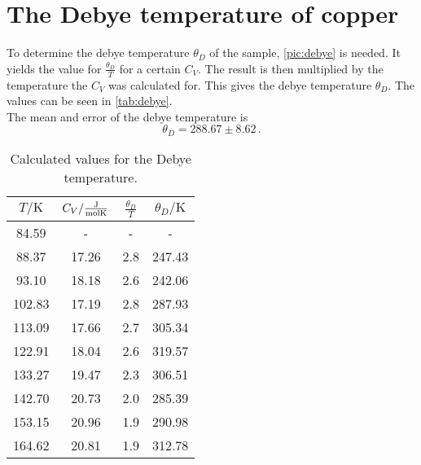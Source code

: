 \section{The Debye temperature of copper}

To determine the debye temperature $\theta_D$ of the sample, \autoref{pic:debye} is needed. It yields the value for $\frac{\theta_D}{T}$ for a certain $C_V$.
The result is then multiplied by the temperature the $C_V$ was calculated for. This gives the debye temperature $\theta_D$. The values can be seen in \autoref{tab:debye}.\\
The mean and error of the debye temperature is 
\begin{equation}
    \theta_D = 288.67 \pm 8.62 \, .
\end{equation}
\begin{table}[htbp] 
    \centering 
    \begin{tabular}{cccc} 
        \toprule $T/\unit{\kelvin}$ & $C_V / \unit{\frac{\joule}{\mol\kelvin}} $ & $\frac{\theta_D}{T}$ & $\theta_D/\unit{\kelvin} $\\ 
        \midrule 
        84.59  & -      & - &     -     \\   
        88.37  & 17.26 &  2.8  &  247.43        \\
        93.10  & 18.18  &  2.6 &  242.06    \\
        102.83 & 17.19  &  2.8 &  287.93  \\
        113.09 & 17.66  & 2.7  &  305.34 \\
        122.91 & 18.04 &  2.6  &  319.57   \\
        133.27 & 19.47  & 2.3  &  306.51   \\
        142.70 & 20.73  & 2.0  &  285.39   \\
        153.15 & 20.96  &  1.9 &  290.98    \\
        164.62 & 20.81 &   1.9 &  312.78 \\
                
        \bottomrule 
    \end{tabular} 
    \caption[Tabelle]{Calculated values for the Debye temperature.} 
    \label{tab:debye} 
\end{table}